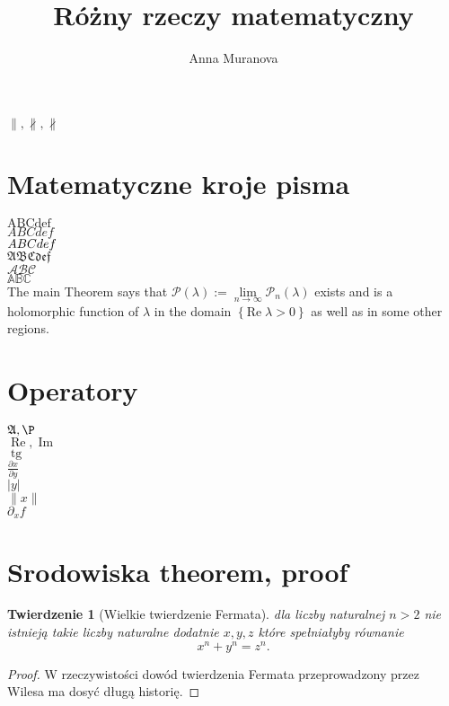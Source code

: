 \documentclass[a4paper, 12pt, reqno]{amsart}
\author[A. Muranova]{Anna Muranova}
\title{Ró\.zny rzeczy matematyczny}
\newcommand{\A}{\mathfrak {A}}
\renewcommand{\Re}{\operatorname{Re}}%
\renewcommand{\Im}{\operatorname{Im}}%
\newcommand{\tg}{\operatorname{tg}}%
\newcommand{\pd}[2]{\frac{\partial #1}{\partial #2}}%
\newcommand{\pc}[2]{\partial_{#1}#2}%
\newcommand{\abs}[1]{|#1|}
\newcommand{\norm}[1]{\|#1\|}
\newtheorem{theorem}{Twierdzenie}
\theoremstyle{definition}
\begin{document}
\maketitle

$\parallel, \not\parallel, \nparallel$
\section{Matematyczne kroje pisma}
$\mathrm{ABCdef}$\\
$\mathit{ABCdef}$\\
$ \mathnormal{ABCdef}$\\
$\mathfrak{ABCdef}$\\  
$\mathcal{ABC}$\\
$\mathbb{ABC}$\\


The main Theorem says that $\mathcal{P}\left( \lambda \right) :=\lim\limits_{n\rightarrow\infty} \mathcal{P}_{n}\left(
\lambda \right) $ exists and is a holomorphic function of $\lambda $ in the
domain $\left\{ \mathrm{Re}\;\lambda >0\right\} $ as well as in some other
regions. 


\section{Operatory}
$\A, \P$\\
$ \Re, \Im$\\
$\tg$\\
$\pd{x}{y}$\\
$\abs{y}$\\
$\norm x$\\
$\pc {x}{f}$


\section{Srodowiska theorem, proof}

\begin{theorem}[Wielkie twierdzenie Fermata]\label{F}
dla liczby naturalnej $n>2$ nie istnieją takie liczby naturalne dodatnie $x,y,z$ które spełniałyby równanie 
\begin{equation}\label{1}
{\displaystyle x^{n}+y^{n}=z^{n}.} 
\end{equation}
\end{theorem}
\begin{proof}
W rzeczywistości dowód twierdzenia Fermata przeprowadzony przez Wilesa ma dosyć długą historię.
\end{proof}
\end{document}
